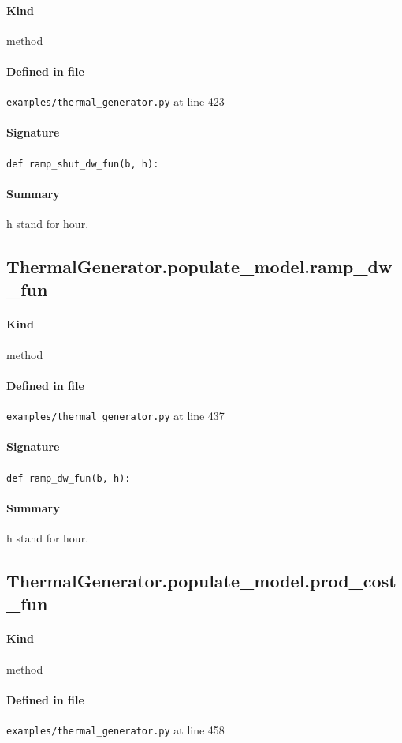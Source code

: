 \documentclass[11pt]{report}
\begin{document}
\paragraph{Kind} method
\paragraph{Defined in file} \texttt{examples/thermal\_generator.py} at line 423
\paragraph{Signature} \texttt{def ramp\_shut\_dw\_fun(b, h):}
\paragraph{Summary} h stand for hour.
\subsection{ThermalGenerator.populate\_model.ramp\_dw\_fun}
\label{def:examples-thermal_generator.py:ThermalGenerator.populate_model.ramp_dw_fun:L437}
\paragraph{Kind} method
\paragraph{Defined in file} \texttt{examples/thermal\_generator.py} at line 437
\paragraph{Signature} \texttt{def ramp\_dw\_fun(b, h):}
\paragraph{Summary} h stand for hour.
\subsection{ThermalGenerator.populate\_model.prod\_cost\_fun}
\label{def:examples-thermal_generator.py:ThermalGenerator.populate_model.prod_cost_fun:L458}
\paragraph{Kind} method
\paragraph{Defined in file} \texttt{examples/thermal\_generator.py} at line 458
\end{document}
